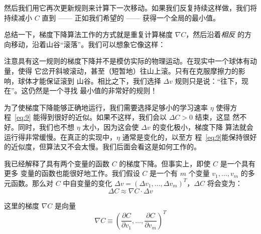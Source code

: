然后我们用它再次更新规则来计算下一次移动。如果我们反复持续这样做，我们将持续减小
$C$ 直到 —— 正如我们希望的 —— 获得一个全局的最小值。

总结一下，梯度下降算法工作的方式就是重复计算梯度 $\nabla C$，然后沿着\emph{相反}
的方向移动，沿着山谷``滚落''。我们可以想象它像这样：
\begin{center}
\end{center}

注意具有这一规则的梯度下降并不是模仿实际的物理运动。在现实中一个球体有动量，使得
它岔开斜坡滚动，甚至（短暂地）往山上滚。只有在克服摩擦力的影响，球体才能保证滚到
山谷。相比之下，我们选择 $\Delta v$ 规则只是说：``往下，现在''。这仍然是一个寻找
最小值的非常好的规则！

为了使梯度下降能够正确地运行，我们需要选择足够小的学习速率 $\eta$ 使得方
程~\eqref{eq:9} 能得到很好的近似。如果不这样，我们会以 $\Delta C > 0$ 结束，这显
然不好。同时，我们也不想 $\eta$ 太小，因为这会使 $\Delta v$ 的变化极小，梯度下降
算法就会运行得非常缓慢。在真正的实现中，$\eta$ 通常是变化的，以至方
程~\eqref{eq:9}能保持很好的近似度，但算法又不会太慢。我们后面会看这是如何工作的。

我已经解释了具有两个变量的函数 $C$ 的梯度下降。但事实上，即使 $C$ 是一个具有更多
变量的函数也能很好地工作。我们假设 $C$ 是一个有 $m$ 个变量 $v_1,\ldots,v_m$ 的多
元函数。那么对 $C$ 中自变量的变化 $\Delta v = (\Delta v_1, \ldots, \Delta
v_m)^T$，$\Delta C$ 将会变为：
\begin{equation}
  \Delta C \approx \nabla C \cdot \Delta v
  \label{eq:12}\tag{12}
\end{equation}

这里的梯度 $\nabla C$ 是向量
\begin{equation}
  \nabla C \equiv \left(\frac{\partial C}{\partial v_1}, \ldots,
    \frac{\partial C}{\partial v_m}\right)^T
  \label{eq:13}\tag{13}
\end{equation}

